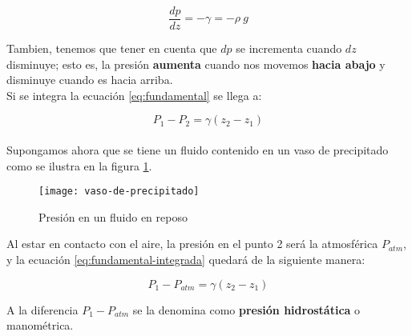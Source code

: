 \begin{equation}
	\dfrac{dp}{dz}= - \gamma = - \rho\ g
	\label{eq:fundamental}
\end{equation}

Tambien, tenemos que tener en cuenta que $dp$ se incrementa cuando $dz$ disminuye; esto es, la presión \textbf{aumenta} cuando nos movemos \textbf{hacia abajo} y disminuye cuando es hacia arriba.\\

Si se integra la ecuación \ref{eq:fundamental} se llega a:

\begin{equation}
	P_1 - P_2 = \gamma (z_2 - z_1)
	\label{eq:fundamental-integrada}
\end{equation}\\


Supongamos ahora que se tiene un fluido contenido en un vaso de precipitado como se ilustra en la figura \ref{fig:precipitado}. 

\begin{figure}[H]
	\centering
	\texttt{[image: vaso-de-precipitado]}
	\caption{Presión en un fluido en reposo}
	\label{fig:precipitado}
\end{figure}

Al estar en contacto con el aire, la presión en el punto 2 será la atmosférica $P_{atm}$, y la ecuación \ref{eq:fundamental-integrada} quedará de la siguiente manera:




\begin{equation}
	P_1 - P_{atm} = \gamma (z_2 - z_1)
\end{equation}


A la diferencia $P_1 - P_{atm}$ se la denomina como \textbf{presión hidrostática} o manométrica.\\



